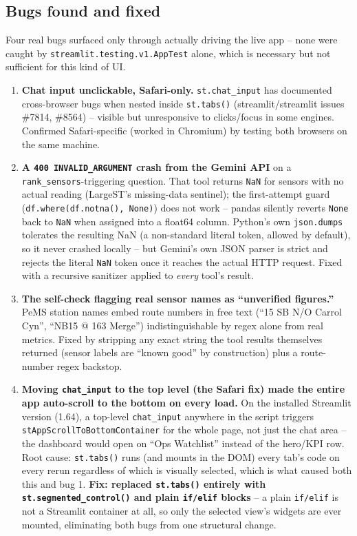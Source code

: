 \documentclass[11pt]{article}
\newcommand{\code}[1]{\texttt{\small #1}}
\begin{document}
\subsection{Bugs found and fixed}
Four real bugs surfaced only through actually driving the live app -- none were caught by
\code{streamlit.testing.v1.\allowbreak AppTest} alone, which is necessary but not sufficient for
this kind of UI.

\begin{enumerate}
\item \textbf{Chat input unclickable, Safari-only.} \code{st.chat\_input} has documented
  cross-browser bugs when nested inside \code{st.tabs()} (streamlit/streamlit issues \#7814,
  \#8564) -- visible but unresponsive to clicks/focus in some engines. Confirmed Safari-specific
  (worked in Chromium) by testing both browsers on the same machine.
\item \textbf{A \code{400 INVALID\_ARGUMENT} crash from the Gemini API} on a
  \code{rank\_sensors}-triggering question. That tool returns \code{NaN} for sensors with no
  actual reading (LargeST's missing-data sentinel); the first-attempt guard
  (\code{df.where(df.notna(), None)}) does not work -- pandas silently reverts \code{None} back to
  \code{NaN} when assigned into a float64 column. Python's own \code{json.dumps} tolerates the
  resulting NaN (a non-standard literal token, allowed by default), so it never crashed locally --
  but Gemini's own JSON parser is strict and rejects the literal \code{NaN} token once it reaches
  the actual HTTP request. Fixed with a recursive sanitizer applied to \emph{every} tool's result.
\item \textbf{The self-check flagging real sensor names as ``unverified figures.''} PeMS station
  names embed route numbers in free text (``15 SB N/O Carrol Cyn'', ``NB15 @ 163 Merge'')
  indistinguishable by regex alone from real metrics. Fixed by stripping any exact string the tool
  results themselves returned (sensor labels are ``known good'' by construction) plus a
  route-number regex backstop.
\item \textbf{Moving \code{chat\_input} to the top level (the Safari fix) made the entire app
  auto-scroll to the bottom on every load.} On the installed Streamlit version (1.64), a top-level
  \code{chat\_input} anywhere in the script triggers \code{stAppScrollToBottomContainer} for the
  whole page, not just the chat area -- the dashboard would open on ``Ops Watchlist'' instead of
  the hero/KPI row. Root cause: \code{st.tabs()} runs (and mounts in the DOM) every tab's code on
  every rerun regardless of which is visually selected, which is what caused both this and bug 1.
  \textbf{Fix: replaced \code{st.tabs()} entirely with \code{st.segmented\_control()} and plain
  \code{if/elif} blocks} -- a plain \code{if/elif} is not a Streamlit container at all, so only
  the selected view's widgets are ever mounted, eliminating both bugs from one structural change.
\end{enumerate}
\end{document}
